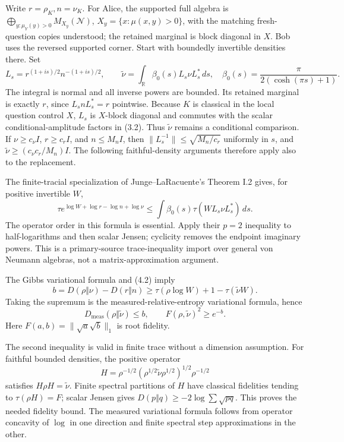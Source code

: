 \documentclass[11pt,reqno]{amsart}
\numberwithin{equation}{section}
\begin{document}
Write \(r=\rho_K,n=\nu_K\). For Alice, the supported full algebra is \(\bigoplus_{y:\mu_Y(y)>0}M_{X_y}(\mathcal N)\), \(X_y=\{x:\mu(x,y)>0\}\), with the matching fresh-question copies understood; the retained marginal is block diagonal in \(X\). Bob uses the reversed supported corner. Start with boundedly invertible densities there. Set \[
 L_s=r^{(1+is)/2}n^{-(1+is)/2},\qquad
 \widetilde\nu=\int_{\mathbb R}\beta_0(s)L_s\nu L_s^*\,ds,
\quad
 \beta_0(s)=\frac{\pi}{2(\cosh(\pi s)+1)}. \tag{4.1}
\] The integral is normal and all inverse powers are bounded. Its retained marginal is exactly \(r\), since \(L_snL_s^*=r\) pointwise. Because \(K\) is classical in the local question control \(X\), \(L_s\) is \(X\)-block diagonal and commutes with the scalar conditional-amplitude factors in (3.2). Thus \(\widetilde\nu\) remains a conditional comparison. If \(\nu\ge c_\nu I\), \(r\ge c_rI\), and \(n\le M_nI\), then \(\|L_s^{-1}\|\le\sqrt{M_n/c_r}\) uniformly in \(s\), and \(\widetilde\nu\ge(c_\nu c_r/M_n)I\). The following faithful-density arguments therefore apply also to the replacement.

The finite-tracial specialization of Junge--LaRacuente's Theorem I.2 \cite{JL} gives, for positive invertible \(W\), \[
 \tau e^{\log W+\log r-\log n+\log\nu}
 \le\int\beta_0(s)\tau(WL_s\nu L_s^*)\,ds. \tag{4.2}
\] The operator order in this formula is essential. Apply their \(p=2\) inequality to half-logarithms and then scalar Jensen; cyclicity removes the endpoint imaginary powers. This is a primary-source trace-inequality import over general von Neumann algebras, not a matrix-approximation argument.

The Gibbs variational formula and (4.2) imply \[
 b=D(\rho\Vert\nu)-D(r\Vert n)
 \ge \tau(\rho\log W)+1-\tau(\widetilde\nu W).
\] Taking the supremum is the measured-relative-entropy variational formula, hence \[
 D_{\mathrm{meas}}(\rho\Vert\widetilde\nu)\le b,\qquad
 F(\rho,\widetilde\nu)^2\ge e^{-b}. \tag{4.3}
\] Here \(F(a,b)=\|\sqrt a\sqrt b\|_1\) is root fidelity.

The second inequality is valid in finite trace without a dimension assumption. For faithful bounded densities, the positive operator \[
 H=\rho^{-1/2}(\rho^{1/2}\widetilde\nu\rho^{1/2})^{1/2}\rho^{-1/2}
\] satisfies \(H\rho H=\widetilde\nu\). Finite spectral partitions of \(H\) have classical fidelities tending to \(\tau(\rho H)=F\); scalar Jensen gives \(D(p\Vert q)\ge-2\log\sum\sqrt{pq}\). This proves the needed fidelity bound. The measured variational formula follows from operator concavity of \(\log\) in one direction and finite spectral step approximations in the other.
\end{document}
